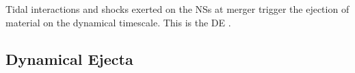 

Tidal interactions and shocks exerted on the \acp{NS} at merger 
trigger the ejection of material on the dynamical timescale. This is the \ac{DE} 
\citep[\eg][]{Hotokezaka:2013b,Bauswein:2013yna,Radice:2016dwd,Radice:2018pdn}. 



\subsection{Dynamical Ejecta} \label{sec:bns_sims:dyn}



%
%


